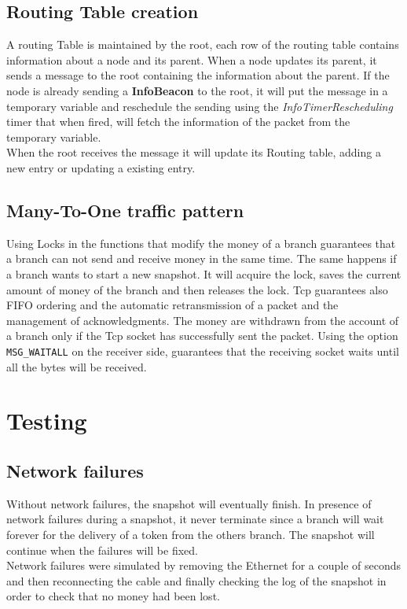 \documentclass{article}
\begin{document}
\subsection{Routing Table creation}
    A routing Table is maintained by the root, each row of the routing table contains information about a node and its parent. When a node updates its parent, it sends a message to the root containing the information about the parent. If the node is already sending a \textbf{InfoBeacon} to the root, it will put the message in a temporary variable and reschedule the sending using the \emph{InfoTimerRescheduling} timer that when fired, will fetch the information of the packet from the temporary variable. \\
    When the root receives the message it will update its Routing table, adding a new entry or updating a existing entry.
    \subsection{Many-To-One traffic pattern}
        Using Locks in the functions that modify the money of a branch guarantees that a branch can not send and receive money in the same time. The same happens if a branch wants to start a new snapshot. It will acquire the lock, saves the current amount of money of the branch and then releases the lock.
        Tcp guarantees also FIFO ordering and the automatic retransmission of a packet and the management of acknowledgments. The money are withdrawn from the account of a branch only if the Tcp socket has successfully sent the packet.
        Using the option \texttt{MSG\_WAITALL} on the receiver side, guarantees that the receiving socket waits until all the bytes will be received.
\section{Testing}
    \subsection{Network failures}
        Without network failures, the snapshot will eventually finish. In presence of network failures during a snapshot, it never terminate since a branch will wait forever for the delivery of a token from the others branch. The snapshot will continue when the failures will be fixed.\\
        Network failures were simulated by removing the Ethernet for a couple of seconds and then reconnecting the cable and finally checking the log of the snapshot in order to check that no money had been lost.
\end{document}
